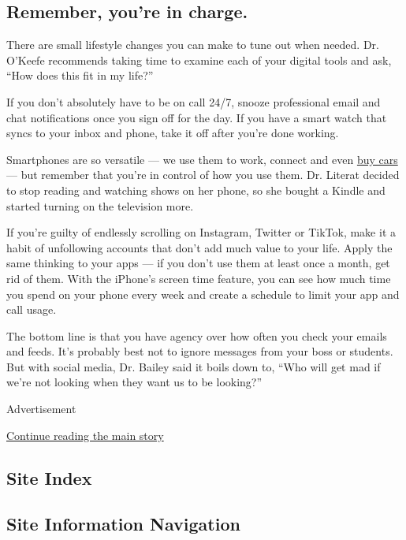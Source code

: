 \hypertarget{remember-youre-in-charge}{%
\subsection{Remember, you're in
charge.}\label{remember-youre-in-charge}}

There are small lifestyle changes you can make to tune out when needed.
Dr. O'Keefe recommends taking time to examine each of your digital tools
and ask, ``How does this fit in my life?''

If you don't absolutely have to be on call 24/7, snooze professional
email and chat notifications once you sign off for the day. If you have
a smart watch that syncs to your inbox and phone, take it off after
you're done working.

Smartphones are so versatile --- we use them to work, connect and even
\href{https://www.comscore.com/Insights/Press-Releases/2020/8/Comscore-Captures-Notable-Rise-of-Mobile-Vehicle-Shopping}{buy
cars} --- but remember that you're in control of how you use them. Dr.
Literat decided to stop reading and watching shows on her phone, so she
bought a Kindle and started turning on the television more.

If you're guilty of endlessly scrolling on Instagram, Twitter or TikTok,
make it a habit of unfollowing accounts that don't add much value to
your life. Apply the same thinking to your apps --- if you don't use
them at least once a month, get rid of them. With the iPhone's screen
time feature, you can see how much time you spend on your phone every
week and create a schedule to limit your app and call usage.

The bottom line is that you have agency over how often you check your
emails and feeds. It's probably best not to ignore messages from your
boss or students. But with social media, Dr. Bailey said it boils down
to, ``Who will get mad if we're not looking when they want us to be
looking?''

Advertisement

\protect\hyperlink{after-bottom}{Continue reading the main story}

\hypertarget{site-index}{%
\subsection{Site Index}\label{site-index}}

\hypertarget{site-information-navigation}{%
\subsection{Site Information
Navigation}\label{site-information-navigation}}

